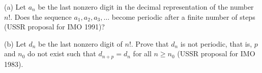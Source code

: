 (a) Let $a_n$ be the last nonzero digit in the decimal representation of the number $n!$. Does the sequence $a_1, a_2, a_3, \ldots$ become periodic after a finite number of steps (USSR proposal for IMO 1991)?

(b) Let $d_n$ be the last nonzero digit of $n!$. Prove that $d_n$ is not periodic, that is, $p$ and $n_0$ do not exist such that $d_{n+p} = d_n$ for all $n \geq n_0$ (USSR proposal for IMO 1983).
